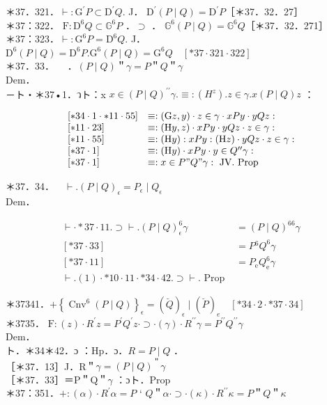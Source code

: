 \documentclass[10pt]{article}
\begin{document}
＊37．321．$\vdash: \mathrm{G}^{\prime} P \subset \mathrm{D}^{\prime} Q$. J． $\mathrm{D}^{\prime}(P \mid Q)=\mathrm{D}^{\prime} P$［＊37．32．27］\\
＊37：322． $\mathrm{F}: \mathrm{D}^{6} Q \subset \mathbb{G}^{6} P$ ．$\supset$ ． $\mathbb{G}^{6}(P \mid Q)=\mathbb{G}^{6} Q$［＊37．32．271］\\
＊37：323．$\vdash: \mathrm{G}^{6} P=\mathrm{D}^{6} Q$. J． $\mathrm{D}^{6}(P \mid Q)=\mathrm{D}^{6} P . \mathrm{G}^{6}(P \mid Q)=\mathrm{G}^{6} Q \quad[* 37 \cdot 321 \cdot 322]$\\
＊37．33．$\quad$ ．$(P \mid Q)$＂$\gamma=P$＂$Q$＂$\gamma$\\
Dem．\\
－ト・＊37•1．วト：x $x \in(P \mid Q)^{\prime \prime} \gamma . \equiv:\left(H^{z}\right) . z \in \gamma . x(P \mid Q) z$ ：

$$
\begin{array}{ll}
{[* 34 \cdot 1 \cdot * 11 \cdot 55]} & \equiv:(\mathrm{G} z, y) \cdot z \in \gamma \cdot x P y \cdot y Q z: \\
{[* 11 \cdot 23]} & \equiv:(\mathrm{H} y, z) \cdot x P y \cdot y Q z \cdot z \in \gamma: \\
{[* 11 \cdot 55]} & \equiv:(\mathrm{H} y): x P y:(\mathrm{H} z) \cdot y Q z \cdot z \in \gamma: \\
{[* 37 \cdot 1]} & \equiv:(\mathrm{H} y) \cdot x P y \cdot y \in Q{ }^{\prime \prime} \gamma: \\
{[* 37 \cdot 1]} & \equiv: x \in P " Q " \gamma: \text { JV. Prop }
\end{array}
$$

＊37．34．$\quad \vdash .(P \mid Q)_{\epsilon}=P_{\epsilon} \mid Q_{\epsilon}$\\
Dem．

\[
\begin{array}{lr}
\vdash \cdot * 37 \cdot 11 . \supset \vdash .(P \mid Q)_{\epsilon}^{6} \gamma & =(P \mid Q)^{66} \gamma \\
{[* 37 \cdot 33]} & =P{ }^{6} Q^{6} \gamma \\
{[* 37 \cdot 11]} & =P_{\mathrm{e}} Q_{\mathrm{e}}^{6} \gamma  \tag{1}\\
\vdash .(1) \cdot * 10 \cdot 11 \cdot * 34 \cdot 42 . \supset \vdash . \text { Prop }
\end{array}
\]

＊37341．$+\left\{\operatorname{Cnv}^{6}(P \mid Q)\right\}_{\epsilon}=(\breve{Q})_{\epsilon} \mid(\breve{P})_{e} \quad[* 34 \cdot 2 \cdot * 37 \cdot 34]$\\
＊3735． $\mathrm{F}:(z) \cdot R^{\prime} z=P^{\prime} Q^{\prime} z \cdot \supset \cdot(\gamma) \cdot R^{\prime \prime} \gamma=P^{\prime \prime} Q^{\prime \prime} \gamma$\\
Dem．\\
ト．＊34＊42．ɔ ：Hp．ɔ．$R=P \mid Q$ ．\\
［＊37．13］J．R＂$\gamma=(P \mid Q)^{\text {＂}} \gamma$\\
［＊37．33］＝P＂Q＂$\gamma$ ：ɔト．Prop\\
＊37：351．$+:(\alpha) \cdot R^{\prime} \alpha=P$ ‘ $Q$＂$\alpha \cdot \supset \cdot(\kappa) \cdot R^{\prime \prime} \kappa=P$＂$Q$＂$\kappa$
\end{document}
